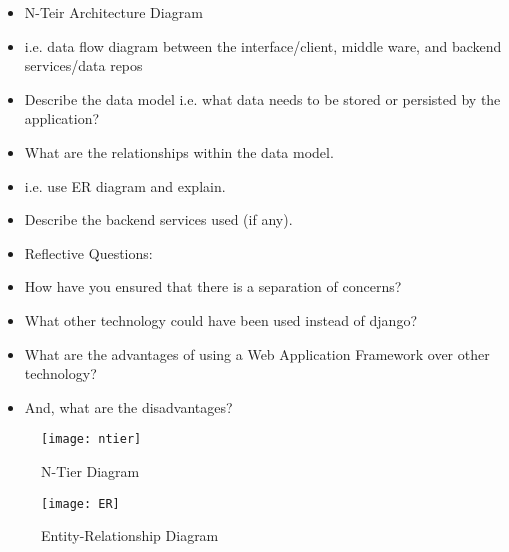 \begin{itemize}
\item	N-Teir Architecture Diagram
\item	i.e. data flow diagram between the interface/client, middle ware, and backend services/data repos
\item	Describe the data model i.e. what data needs to be stored or persisted by the application?
\item	What are the relationships within the data model.
\item	i.e. use ER diagram and explain.
\item	Describe the backend services used (if any).
\item	Reflective Questions: 
\item	How have you ensured that there is a separation of concerns? 
\item	What other technology could have been used instead of django? 
\item	What are the advantages of using a Web Application Framework over other technology? 
\item	And, what are the disadvantages?
\end{itemize}

\begin{figure}[h]
  \begin{center}
    \texttt{[image: ntier]}
    \caption{N-Tier Diagram} \label{fig:n-tier}
  \end{center}
\end{figure}

\begin{figure}[h]
  \begin{center}
    \texttt{[image: ER]}
    \caption{Entity-Relationship Diagram} \label{fig:ER}
  \end{center}
\end{figure}

